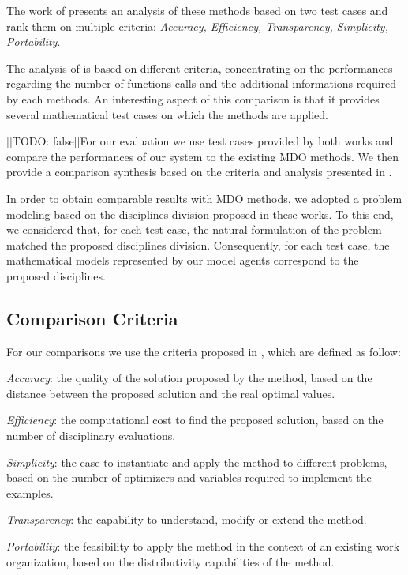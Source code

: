 The work of \cite{perez2004evaluation} presents an analysis of these methods based on two test cases and rank them on multiple criteria: \emph{Accuracy, Efficiency, Transparency, Simplicity, Portability}.

The analysis of \cite{Yi2008} is based on different criteria, concentrating on the performances regarding the number of functions calls and the additional informations required by each methods. An interesting aspect of this comparison is that it provides several mathematical test cases on which the methods are applied.

||TODO: false]]For our evaluation we use test cases provided by both works and compare the performances of our system to the existing MDO methods. We then provide a comparison synthesis based on the criteria and analysis presented in \cite{perez2004evaluation}.

In order to obtain comparable results with MDO methods, we adopted a problem modeling based on the disciplines division proposed in these works. To this end, we considered that, for each test case, the natural formulation of the problem matched the proposed disciplines division. Consequently, for each test case, the mathematical models represented by our model agents correspond to the proposed disciplines.

\subsection{Comparison Criteria}

For our comparisons we use the criteria proposed in \cite{perez2004evaluation}, which are defined as follow:
\begin{compactitem}
\item \emph{Accuracy}: the quality of the solution proposed by the method, based on the distance between the proposed solution and the real optimal values.
\item \emph{Efficiency}: the computational cost to find the proposed solution, based on the number of disciplinary evaluations.
\item \emph{Simplicity}: the ease to instantiate and apply the method to different problems, based on the number of optimizers and variables required to implement the examples.
\item \emph{Transparency}: the capability to understand, modify or extend the method.
\item \emph{Portability}: the feasibility to apply the method in the context of an existing work organization, based on the distributivity capabilities of the method.
\end{compactitem}
 
